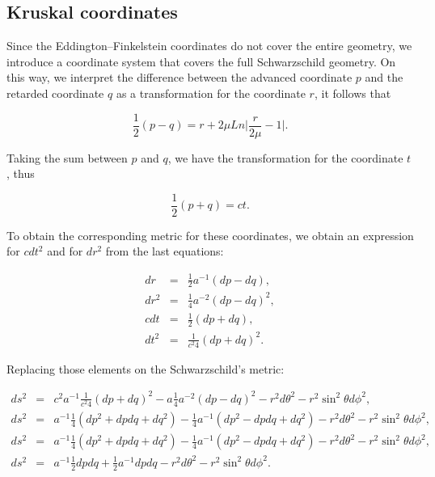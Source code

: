 \documentclass[letterpaper,11pt,onecolumn]{article}
\begin{document}
\subsection{Kruskal coordinates}

Since the Eddington–Finkelstein coordinates do not cover the entire geometry, we introduce a coordinate system that covers the full Schwarzschild geometry. On this way, we interpret the difference between the advanced coordinate $p$ and the retarded coordinate $q$ as a transformation for the coordinate $r$, it follows that

\begin{equation*}
    \frac{1}{2}(p-q)=r+2\mu Ln\Big| \frac{r}{2\mu}-1 \Big|.
\end{equation*}

Taking the sum between $p$ and $q$, we have the transformation for the coordinate $t$, thus

\begin{equation}
    \frac{1}{2}(p+q)=ct. \label{50}
\end{equation}

To obtain the corresponding metric for these coordinates, we obtain an expression for $cdt^2$ and for $dr^2$ from the last equations:

\begin{eqnarray*}
dr&=& \frac{1}{2}a^{-1}(dp-dq),\\
dr^2&=& \frac{1}{4}a^{-2}(dp-dq)^2,\\
    cdt&=& \frac{1}{2}(dp+dq), \\
    dt^{2}&=& \frac{1}{c^{2}4}(dp+dq)^2.
\end{eqnarray*}

Replacing those elements on the Schwarzschild's metric:

\begin{eqnarray*}
    	ds^2 &=&c^2a^{-1}\frac{1}{c^{2}4}(dp+dq)^2-a \frac{1}{4}a^{-2}(dp-dq)^2 - r^2 d\theta^2 - r^2 \sin^2 \theta d\phi^2,\\
    	ds^2 &=&a^{-1}\frac{1}{4}(dp^2+dpdq+dq^2)- \frac{1}{4}a^{-1}(dp^2-dpdq+dq^2) - r^2 d\theta^2 - r^2 \sin^2 \theta d\phi^2,\\
    	ds^2 &=&a^{-1}\frac{1}{4}(dp^2+dpdq+dq^2)- \frac{1}{4}a^{-1}(dp^2-dpdq+dq^2) - r^2 d\theta^2 - r^2 \sin^2 \theta d\phi^2,\\
    		ds^2 &=&a^{-1}\frac{1}{2}dpdq+ \frac{1}{2}a^{-1}dpdq - r^2 d\theta^2 - r^2 \sin^2 \theta d\phi^2.\\
\end{eqnarray*}
\end{document}
